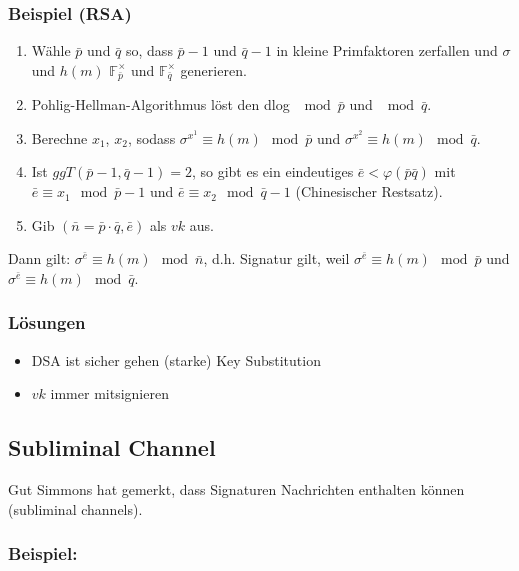 \documentclass[a4paper,twoside,DIV15,BCOR12mm]{scrbook}
\begin{document}
\subsubsection{Beispiel (RSA)}

\begin{enumerate}
	\item Wähle $\bar p$ und $\bar q$ so, dass $\bar p -1$ und $\bar q - 1$ in kleine Primfaktoren zerfallen und $\sigma$ und $h(m)$ $\mathbb{F}_{\bar p}^\times$ und $\mathbb{F}_{\bar q}^\times$ generieren.
	\item Pohlig-Hellman-Algorithmus löst den dlog $\mod{\bar p}$ und $\mod{\bar q}$.
	\item Berechne $x_1$, $x_2$, sodass $\sigma^{x^1} \equiv h(m) \mod{\bar p}$ und $\sigma^{x^2} \equiv h(m) \mod{\bar q}$.
	\item Ist $ggT(\bar p -1, \bar q - 1) = 2$, so gibt es ein eindeutiges $\bar e < \varphi(\bar p \bar q)$ mit $\bar e \equiv x_1 \mod{\bar p - 1}$ und $\bar e \equiv x_2 \mod{\bar q - 1}$ (Chinesischer Restsatz).
	\item Gib $(\bar n = \bar p \cdot \bar q, \bar e)$ als $vk$ aus.
\end{enumerate}

Dann gilt: $\sigma^{\bar e} \equiv h(m) \mod{\bar n}$, d.h. Signatur gilt, weil $\sigma^{\bar e} \equiv h(m) \mod{\bar p}$ und $\sigma^{\bar e} \equiv h(m) \mod{\bar q}$.

\subsubsection{Lösungen}

\begin{itemize}
	\item DSA ist sicher gehen (starke) Key Substitution
	\item $vk$ immer mitsignieren
\end{itemize}

\subsection{Subliminal Channel}

Gut Simmons hat gemerkt, dass Signaturen Nachrichten enthalten können (subliminal channels). 

\subsubsection{Beispiel:}
\end{document}
